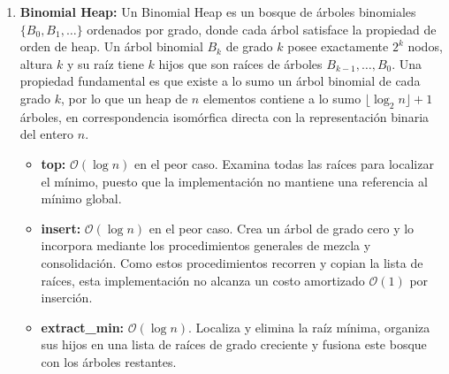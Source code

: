 \documentclass[11pt,letterpaper]{article}
\begin{document}
\begin{enumerate}
\begin{itemize}
    \item \textbf{build\_heap:} $\mathcal{O}(n)$, mediante el algoritmo lineal de Floyd (\texttt{std::make\_heap}), el cual aplica \textit{sift-down} secuencial descendente desde el último nodo no hoja ($\lfloor n/2 \rfloor - 1$) hacia la raíz. Al procesar cada nodo, sus subárboles ya satisfacen la propiedad de heap, alcanzando costo total lineal $\mathcal{O}(n)$.
    
    \item \textbf{meld (fusión):} $\mathcal{O}(n+m)$, donde $n$ y $m$
    representan el número de elementos de los heaps de entrada,
    respectivamente. La operación añade los $m$ elementos del segundo
    heap al final del vector que contiene los $n$ elementos del primero.
    Posteriormente, aplica \texttt{std::make\_heap} sobre los $n+m$
    elementos para restablecer la propiedad de heap. El costo total
    es lineal respecto del tamaño combinado, suponiendo comparaciones 
    y movimientos de elementos de costo constante.
\end{itemize}
\newpage

\item \textbf{Binomial Heap:}
Un Binomial Heap es un bosque de árboles binomiales $\{B_0, B_1, \dots\}$ ordenados por grado, donde cada árbol satisface la propiedad de orden de heap. Un árbol binomial $B_k$ de grado $k$ posee exactamente $2^k$ nodos, altura $k$ y su raíz tiene $k$ hijos que son raíces de árboles $B_{k-1}, \dots, B_0$.
Una propiedad fundamental es que existe a lo sumo un árbol binomial de cada grado $k$, por lo que un heap de $n$ elementos contiene a lo sumo $\lfloor \log_2 n \rfloor + 1$ árboles, en correspondencia isomórfica directa con la representación binaria del entero $n$.
\begin{itemize}
    \item \textbf{top:} $\mathcal{O}(\log n)$ en el peor caso.
    Examina todas las raíces para localizar el mínimo, puesto que
    la implementación no mantiene una referencia al mínimo global.

    \item \textbf{insert:} $\mathcal{O}(\log n)$ en el peor caso.
    Crea un árbol de grado cero y lo incorpora mediante los
    procedimientos generales de mezcla y consolidación. Como
    estos procedimientos recorren y copian la lista de raíces,
    esta implementación no alcanza un costo amortizado
    $\mathcal{O}(1)$ por inserción.

    \item \textbf{extract\_min:} $\mathcal{O}(\log n)$.
    Localiza y elimina la raíz mínima, organiza sus hijos en
    una lista de raíces de grado creciente y fusiona este
    bosque con los árboles restantes.


\end{itemize}
\end{enumerate}
\end{document}
